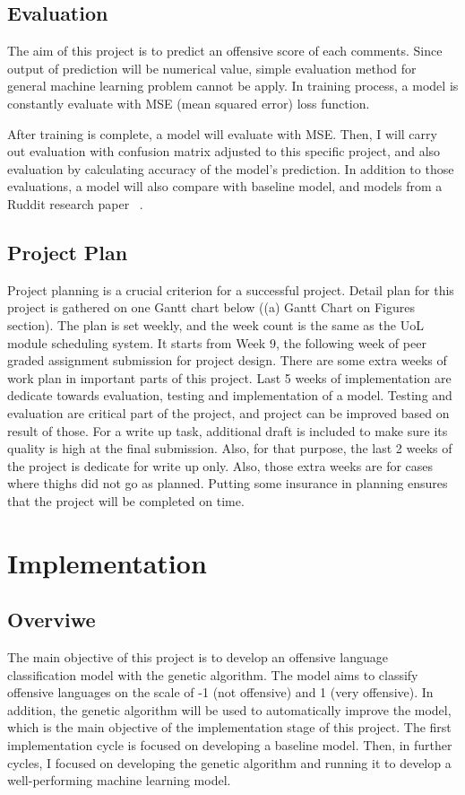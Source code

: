 \documentclass[11pt, natbib=false]{article}
\begin{document}
\subsection{Evaluation}
The aim of this project is to predict an offensive score of each comments.
Since output of prediction will be numerical value, simple evaluation method for general machine learning problem cannot be apply.
In training process, a model is constantly evaluate with MSE (mean squared error) loss function.

After training is complete, a model will evaluate with MSE.
Then, I will carry out evaluation with confusion matrix adjusted to this specific project, and also evaluation by calculating accuracy of the model’s prediction.
In addition to those evaluations, a model will also compare with baseline model, and models from a Ruddit research paper ~\cite{hada2021ruddit}.


\subsection{Project Plan}
Project planning is a crucial criterion for a successful project.
Detail plan for this project is gathered on one Gantt chart below ((a) Gantt Chart on Figures section).
The plan is set weekly, and the week count is the same as the UoL module scheduling system.
It starts from Week 9, the following week of peer graded assignment submission for project design.
There are some extra weeks of work plan in important parts of this project.
Last 5 weeks of implementation are dedicate towards evaluation, testing and implementation of a model.
Testing and evaluation are critical part of the project, and project can be improved based on result of those.
For a write up task, additional draft is included to make sure its quality is high at the final submission.
Also, for that purpose, the last 2 weeks of the project is dedicate for write up only.
Also, those extra weeks are for cases where thighs did not go as planned.
Putting some insurance in planning ensures that the project will be completed on time. 


\section{Implementation}
\subsection{Overviwe}
The main objective of this project is to develop an offensive language classification model with the genetic algorithm.
The model aims to classify offensive languages on the scale of -1 (not offensive) and 1 (very offensive).
In addition, the genetic algorithm will be used to automatically improve the model, which is the main objective of the implementation stage of this project.
The first implementation cycle is focused on developing a baseline model.
Then, in further cycles, I focused on developing the genetic algorithm and running it to develop a well-performing machine learning model.
\end{document}
